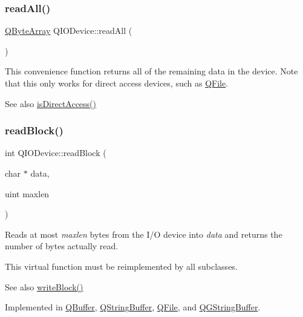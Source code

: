\mbox{\label{class_q_i_o_device_a2b93df374c6eea09c68a95cf99d66e6f}} 
\subsubsection{\texorpdfstring{readAll()}{readAll()}}
{\footnotesize\ttfamily \mbox{\hyperlink{class_q_array}{Q\+Byte\+Array}} Q\+I\+O\+Device\+::read\+All (\begin{DoxyParamCaption}{ }\end{DoxyParamCaption})}

This convenience function returns all of the remaining data in the device. Note that this only works for direct access devices, such as \mbox{\hyperlink{class_q_file}{Q\+File}}.

\begin{DoxySeeAlso}{See also}
\mbox{\hyperlink{class_q_i_o_device_ace782017b9a264d7d1759223add28ae7}{is\+Direct\+Access()}} 
\end{DoxySeeAlso}
\mbox{\label{class_q_i_o_device_a71f10647e4bd98141f45362b9a06983a}} 
\subsubsection{\texorpdfstring{readBlock()}{readBlock()}}
{\footnotesize\ttfamily int Q\+I\+O\+Device\+::read\+Block (\begin{DoxyParamCaption}\item[{char $\ast$}]{data,  }\item[{uint}]{maxlen }\end{DoxyParamCaption})\hspace{0.3cm}{\ttfamily [pure virtual]}}

Reads at most {\itshape maxlen} bytes from the I/O device into {\itshape data} and returns the number of bytes actually read.

This virtual function must be reimplemented by all subclasses.

\begin{DoxySeeAlso}{See also}
\mbox{\hyperlink{class_q_i_o_device_a5d937df1bde2f956872dd54e077807d1}{write\+Block()}} 
\end{DoxySeeAlso}


Implemented in \mbox{\hyperlink{class_q_buffer_a7deacf4bbd599f075f3dad4b20cafeb0}{Q\+Buffer}}, \mbox{\hyperlink{class_q_string_buffer_a6cda82dda018af5291df80676eb037a4}{Q\+String\+Buffer}}, \mbox{\hyperlink{class_q_file_ab9a42e65a2fcd51bae5f2a186ff5bee5}{Q\+File}}, and \mbox{\hyperlink{class_q_g_string_buffer_aa5ab1052c6a1a9365418f55c55022fb2}{Q\+G\+String\+Buffer}}.

